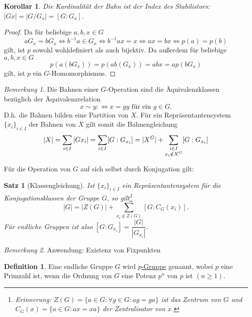 \documentclass[12pt]{scrartcl} %
\newtheorem{thm}{Satz}
\newtheorem{kor}{Korollar}
\theoremstyle{definition}
\newtheorem*{defn}{Definition}
\theoremstyle{remark}
\newtheorem*{nb}{Bemerkung}
\newcommand{\defi}{\underline}
\begin{document}
\begin{kor}
	Die Kardinalität der Bahn ist der Index des Stabilistors: $|Gx|=|G/G_x|=[G:G_x]$.
\end{kor}
	
\begin{proof}
	Da für beliebige \(a,b,x \in G\)
	$$aG_x=bG_x \Leftrightarrow b^{-1}a \in G_x \Leftrightarrow b^{-1}ax=x \Leftrightarrow ax=bx \Leftrightarrow p(a)=p(b)$$
	gilt, ist $p$ sowohl wohldefiniert als auch bijektiv.
	Da außerdem für beliebige \(a,b,x \in G\)
	$$p(a(bG_x))=p(ab(G_x))=abx=ap(bG_x)$$
	gilt, ist $p$ ein $G$-Homomorphismus.
\end{proof}

\begin{nb}
	Die Bahnen einer $G$-Operation sind die Äquivalenzklassen bezüglich der Äquivalenzrelation
	\[x \sim y :\Leftrightarrow \text{\(x=gy\) für ein \(g\in G\).}\]
	D.h. die Bahnen bilden eine Partition von $X$.
	Für ein Repräsentantensystem $\{x_i\}_{i\in I}$ der Bahnen von \(X\) gilt somit die Bahnengleichung
	$$|X|=\sum\limits_{\begin{subarray}{1}i \in I\end{subarray}}|Gx_i|=\sum\limits_{\begin{subarray}{1}i \in I\end{subarray}}[G:G_{x_i}]=|X^G|+\sum\limits_{\begin{subarray}{c}i \in I\\ x_i \notin X^G\end{subarray}}[G:G_{x_i}]$$
\end{nb}

Für die Operation von \(G\) auf sich selbst durch Konjugation gilt:
\begin{thm} [Klassengleichung]
	Ist $\{x_{i}\}_{i \in I}$ ein Repräsentantensystem für die Konjugationsklassen der Gruppe \(G\), so gilt\footnote{Erinnerung: \(Z(G)=\{a \in G : \forall g \in G: ag=ga\}\) ist das Zentrum von \(G\) und \(C_G(x) = \{a \in G :ax = xa\}\) der Zentralisator von \(x\).}
	\[|G|= |Z(G)|+\sum_{x_{i}\notin Z(G)}[G:C_{G}(x_{i})].\]
	Für endliche Gruppen ist also $[G:G_{x_{i}}]=\dfrac{|G|}{|G_{x_{i}}|}$. %
\end{thm}

\begin{nb}
	Anwendung: Existenz von Fixpunkten
\end{nb}

\begin{defn}
	Eine endliche Gruppe \(G\) wird \defi{\(p\)-Gruppe} genannt, wobei \(p\) eine Primzahl ist, wenn die Ordnung von \(G\) eine Potenz $p^n$ von \(p\) ist $(n\geq 1)$.
\end{defn}
\end{document}
